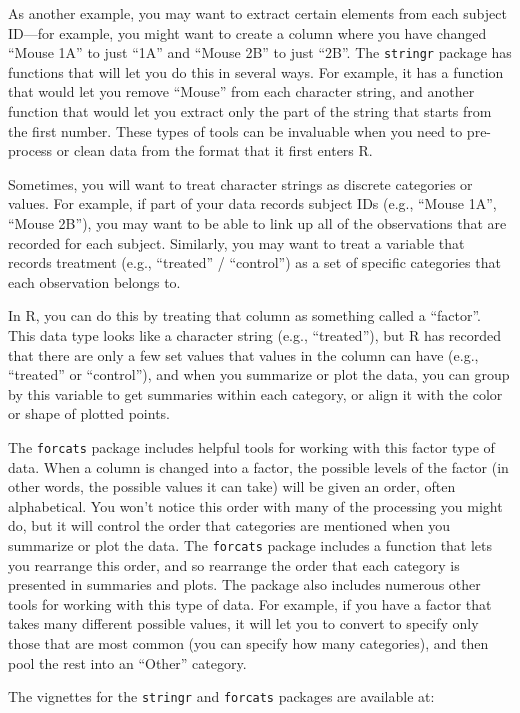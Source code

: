 \documentclass[]{tufte-book}
\begin{document}
As another example, you may want to extract certain elements from each subject
ID---for example, you might want to create a column where you have changed
``Mouse 1A'' to just ``1A'' and ``Mouse 2B'' to just ``2B''. The \texttt{stringr} package has
functions that will let you do this in several ways. For example, it has a
function that would let you remove ``Mouse'' from each character string, and
another function that would let you extract only the part of the string that
starts from the first number. These types of tools can be invaluable when you
need to pre-process or clean data from the format that it first enters R.

Sometimes, you will want to treat character strings as discrete categories
or values. For example, if part of your data records subject IDs
(e.g., ``Mouse 1A'', ``Mouse 2B''), you may want to be able to link up all
of the observations that are recorded for each subject. Similarly, you
may want to treat a variable that records treatment (e.g., ``treated'' / ``control'')
as a set of specific categories that each observation belongs to.

In R, you can do this by treating that column as something called a ``factor''.
This data type looks like a character string (e.g., ``treated''), but R has
recorded that there are only a few set values that values in the column can have
(e.g., ``treated'' or ``control''), and when you summarize or plot the data, you can
group by this variable to get summaries within each category, or align it with
the color or shape of plotted points.

The \texttt{forcats} package includes helpful tools for working with this factor type
of data. When a column is changed into a factor, the possible levels of the
factor (in other words, the possible values it can take) will be given an order,
often alphabetical. You won't notice this order with many of the processing
you might do, but it will control the order that categories are mentioned when
you summarize or plot the data. The \texttt{forcats} package includes a function that
lets you rearrange this order, and so rearrange the order that each category
is presented in summaries and plots. The package also includes numerous other
tools for working with this type of data. For example, if you have a factor
that takes many different possible values, it will let you to convert to
specify only those that are most common (you can specify how many categories),
and then pool the rest into an ``Other'' category.

The vignettes for the \texttt{stringr} and \texttt{forcats} packages are available at:
\end{document}
